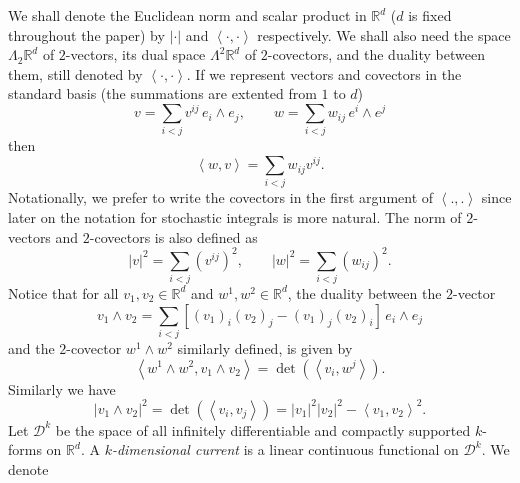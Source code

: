 \documentclass{article}
\begin{document}
We shall denote the Euclidean norm and scalar product in $\mathbb{R}^{d}$ ($%
d $ is fixed throughout the paper) by $\left| \cdot\right| $ and $\left\langle
\cdot,\cdot\right\rangle $ respectively. We shall also need the space $\Lambda _{2}%
\mathbb{R}^{d}$ of $2$-vectors, its dual space $\Lambda ^{2}\mathbb{R}^{d}$
of $2$-covectors, and the duality between them, still denoted by $%
\left\langle \cdot,\cdot\right\rangle $. If we represent vectors and covectors in
the standard basis (the summations are extented from $1$ to $d$) 
\begin{equation*}
v=\sum_{i<j}v^{ij}\,e_{i}\wedge e_{j},\qquad w=\sum_{i<j}w_{ij}\,e^{i}\wedge
e^{j}
\end{equation*}
then 
\begin{equation*}
\left\langle w,v\right\rangle =\sum_{i<j}w_{ij}v^{ij}.
\end{equation*}
Notationally, we prefer to write the covectors in the first argument of $%
\left\langle .,.\right\rangle $ since later on the notation for stochastic
integrals is more natural. The norm of $2$-vectors and $2$-covectors is also
defined as 
\begin{equation*}
\left| v\right| ^{2}=\sum_{i<j}\left( v^{ij}\right) ^{2},\qquad \left|
w\right| ^{2}=\sum_{i<j}\left( w_{ij}\right) ^{2}.
\end{equation*}
Notice that for all $v_{1},v_{2}\in \mathbb{R}^{d}$ and $w^{1},w^{2}\in 
\mathbb{R}^{d}$, the duality between the $2$-vector 
\begin{equation*}
v_{1}\wedge v_{2}=\sum_{i<j}\left[ \left( v_{1}\right) _{i}\left(
v_{2}\right) _{j}-\left( v_{1}\right) _{j}\left( v_{2}\right) _{i}\right]
\,e_{i}\wedge e_{j}
\end{equation*}
and the $2$-covector $w^{1}\wedge w^{2}$ similarly defined, is given by 
\begin{equation*}
\left\langle w^{1}\wedge w^{2},v_{1}\wedge v_{2}\right\rangle =\det \left(
\left\langle v_{i},w^{j}\right\rangle \right) .
\end{equation*}
Similarly we have 
\begin{equation*}
\left| v_{1}\wedge v_{2}\right| ^{2}=\det \left( \left\langle
v_{i},v_{j}\right\rangle \right) =\left| v_{1}\right| ^{2}\left|
v_{2}\right| ^{2}-\left\langle v_{1},v_{2}\right\rangle ^{2}.
\end{equation*}
Let $\mathcal{D}^{k}$ be the space of all infinitely differentiable and
compactly supported $k$-forms on $\mathbb{R}^{d}$. A $k$\textit{-dimensional
current} is a linear continuous functional on $\mathcal{D}^{k}$. We denote
\end{document}
